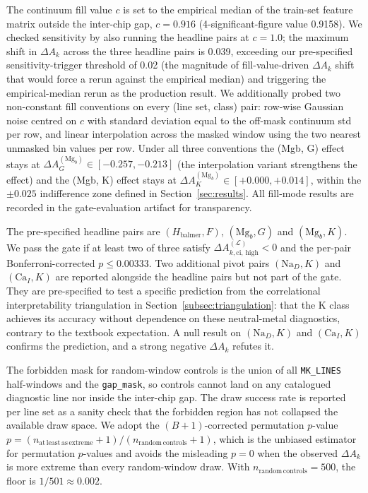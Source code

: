 \documentclass[11pt,a4paper]{article}
\newcommand{\dA}{\Delta A}
\begin{document}
The continuum fill value $c$ is set to the empirical median of the train-set feature matrix outside the inter-chip gap, $c = 0.916$ (4-significant-figure value 0.9158). We checked sensitivity by also running the headline pairs at $c = 1.0$; the maximum shift in $\dA_k$ across the three headline pairs is 0.039, exceeding our pre-specified sensitivity-trigger threshold of 0.02 (the magnitude of fill-value-driven $\dA_k$ shift that would force a rerun against the empirical median) and triggering the empirical-median rerun as the production result. We additionally probed two non-constant fill conventions on every (line set, class) pair: row-wise Gaussian noise centred on $c$ with standard deviation equal to the off-mask continuum std per row, and linear interpolation across the masked window using the two nearest unmasked bin values per row. Under all three conventions the (Mgb, G) effect stays at $\dA_G^{(\mathrm{Mg}_b)} \in [-0.257, -0.213]$ (the interpolation variant strengthens the effect) and the (Mgb, K) effect stays at $\dA_K^{(\mathrm{Mg}_b)} \in [+0.000, +0.014]$, within the $\pm 0.025$ indifference zone defined in Section~\ref{sec:results}. All fill-mode results are recorded in the gate-evaluation artifact for transparency.

The pre-specified headline pairs are $(H_{\mathrm{balmer}}, F)$, $(\mathrm{Mg}_b, G)$ and $(\mathrm{Mg}_b, K)$. We pass the gate if at least two of three satisfy $\dA^{(\mathcal{L})}_{k,\mathrm{ci,\,high}} < 0$ and the per-pair Bonferroni-corrected $p \leq 0.00333$. Two additional pivot pairs $(\mathrm{Na}_D, K)$ and $(\mathrm{Ca}_I, K)$ are reported alongside the headline pairs but not part of the gate. They are pre-specified to test a specific prediction from the correlational interpretability triangulation in Section~\ref{subsec:triangulation}: that the K class achieves its accuracy without dependence on these neutral-metal diagnostics, contrary to the textbook expectation. A null result on $(\mathrm{Na}_D, K)$ and $(\mathrm{Ca}_I, K)$ confirms the prediction, and a strong negative $\dA_k$ refutes it.

The forbidden mask for random-window controls is the union of all \texttt{MK\_LINES} half-windows and the \texttt{gap\_mask}, so controls cannot land on any catalogued diagnostic line nor inside the inter-chip gap. The draw success rate is reported per line set as a sanity check that the forbidden region has not collapsed the available draw space. We adopt the \citet{2010SAGMB...9...39P} $(B+1)$-corrected permutation $p$-value $p = (n_{\mathrm{at\,least\,as\,extreme}} + 1) / (n_{\mathrm{random\,controls}} + 1)$, which is the unbiased estimator for permutation $p$-values and avoids the misleading $p = 0$ when the observed $\dA_k$ is more extreme than every random-window draw. With $n_{\mathrm{random\,controls}} = 500$, the floor is $1/501 \approx 0.002$.
\end{document}
